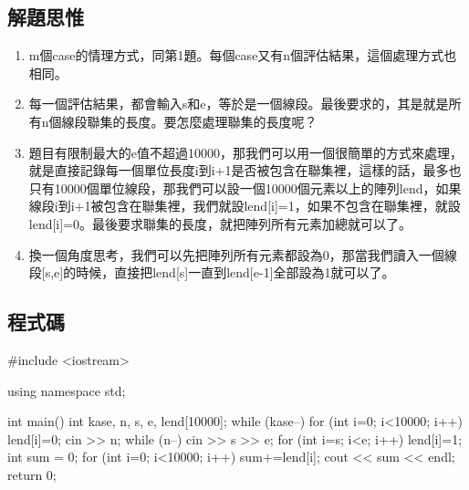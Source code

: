 \subsection{解題思惟}
\begin{enumerate}
	\item m個case的情理方式，同第1題。每個case又有n個評估結果，這個處理方式也相同。
	\item 每一個評估結果，都會輸入s和e，等於是一個線段。最後要求的，其是就是所有n個線段聯集的長度。要怎麼處理聯集的長度呢？
	\item 題目有限制最大的e值不超過10000，那我們可以用一個很簡單的方式來處理，就是直接記錄每一個單位長度i到i+1是否被包含在聯集裡，這樣的話，最多也只有10000個單位線段，那我們可以設一個10000個元素以上的陣列lend，如果線段i到i+1被包含在聯集裡，我們就設lend[i]=1，如果不包含在聯集裡，就設lend[i]=0。最後要求聯集的長度，就把陣列所有元素加總就可以了。
	\item 換一個角度思考，我們可以先把陣列所有元素都設為0，那當我們讀入一個線段[s,e]的時候，直接把lend[s]一直到lend[e-1]全部設為1就可以了。
\end{enumerate}

\subsection{程式碼}
\begin{cppcode}
#include <iostream>

using namespace std;

int main()
{
	int kase, n, s, e, lend[10000];
	while (kase--) {
		for (int i=0; i<10000; i++) lend[i]=0;
		cin >> n;
		while (n--) {
			cin >> s >> e;
			for (int i=s; i<e; i++) lend[i]=1;
		}
		int sum = 0;
		for (int i=0; i<10000; i++) sum+=lend[i];
		cout << sum << endl;
	}
	return 0;
}	
\end{cppcode}